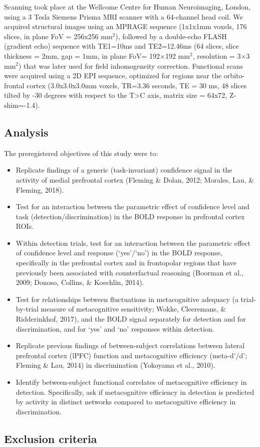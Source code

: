 \documentclass[12pt,twoside]{reedthesis}
\begin{document}
Scanning took place at the Wellcome Centre for Human Neuroimaging, London, using a 3 Tesla Siemens Prisma MRI scanner with a 64-channel head coil.
We acquired structural images using an MPRAGE sequence (1x1x1mm voxels, 176 slices, in plane FoV = 256x256 mm\(^2\)), followed by a double-echo FLASH (gradient echo) sequence with TE1=10ms and TE2=12.46ms (64 slices, slice thickness = 2mm, gap = 1mm, in plane FoV= 192×192 mm\(^2\), resolution = 3×3 mm\(^2\)) that was later used for field inhomogeneity correction. Functional scans were acquired using a 2D EPI sequence, optimized for regions near the orbito-frontal cortex (3.0x3.0x3.0mm voxels, TR=3.36 seconds, TE = 30 ms, 48 slices tilted by -30 degrees with respect to the T\textgreater C axis, matrix size = 64x72, Z-shim=-1.4).

\hypertarget{analysis}{%
\subsection{Analysis}\label{analysis}}

The preregistered objectives of this study were to:
\begin{itemize}
\item
  Replicate findings of a generic (task-invariant) confidence signal in the activity of medial prefrontal cortex (Fleming \& Dolan, 2012; Morales, Lau, \& Fleming, 2018).
\item
  Test for an interaction between the parametric effect of confidence level and task (detection/discrimination) in the BOLD response in prefrontal cortex ROIs.
\item
  Within detection trials, test for an interaction between the parametric effect of confidence level and response (`yes'/`no') in the BOLD response, specifically in the prefrontal cortex and in frontopolar regions that have previously been associated with counterfactual reasoning (Boorman et al., 2009; Donoso, Collins, \& Koechlin, 2014).
\item
  Test for relationships between fluctuations in metacognitive adequacy (a trial-by-trial measure of metacognitive sensitivity; Wokke, Cleeremans, \& Ridderinkhof, 2017), and the BOLD signal separately for detection and for discrimination, and for `yes' and `no' responses within detection.
\item
  Replicate previous findings of between-subject correlations between lateral prefrontal cortex (lPFC) function and metacognitive efficiency (meta-d'/d'; Fleming \& Lau, 2014) in discrimination (Yokoyama et al., 2010).
\item
  Identify between-subject functional correlates of metacognitive efficiency in detection. Specifically, ask if metacognitive efficiency in detection is predicted by activity in distinct networks compared to metacognitive efficiency in discrimination.
\end{itemize}
\hypertarget{exclusion-criteria}{%
\subsection{Exclusion criteria}\label{exclusion-criteria}}
\end{document}
